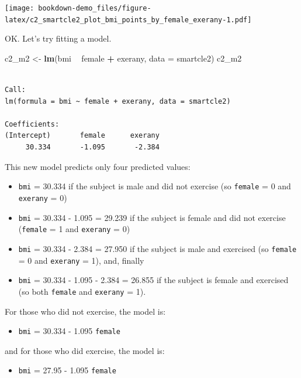 \documentclass[]{book}
\newenvironment{Shaded}{\begin{snugshade}}{\end{snugshade}}
\newcommand{\KeywordTok}[1]{\textcolor[rgb]{0.13,0.29,0.53}{\textbf{#1}}}
\newcommand{\DataTypeTok}[1]{\textcolor[rgb]{0.13,0.29,0.53}{#1}}
\newcommand{\StringTok}[1]{\textcolor[rgb]{0.31,0.60,0.02}{#1}}
\newcommand{\OperatorTok}[1]{\textcolor[rgb]{0.81,0.36,0.00}{\textbf{#1}}}
\newcommand{\NormalTok}[1]{#1}
\providecommand{\tightlist}{%
  \setlength{\itemsep}{0pt}\setlength{\parskip}{0pt}}
\theoremstyle{definition}
\theoremstyle{definition}
\theoremstyle{definition}
\theoremstyle{remark}
\begin{document}
\texttt{[image: bookdown-demo\_files/figure-latex/c2\_smartcle2\_plot\_bmi\_points\_by\_female\_exerany-1.pdf]}

OK. Let's try fitting a model.

\begin{Shaded}
\begin{Highlighting}[]
\NormalTok{c2_m2 <-}\StringTok{ }\KeywordTok{lm}\NormalTok{(bmi }\OperatorTok{~}\StringTok{ }\NormalTok{female }\OperatorTok{+}\StringTok{ }\NormalTok{exerany, }\DataTypeTok{data =}\NormalTok{ smartcle2)}
\NormalTok{c2_m2}
\end{Highlighting}
\end{Shaded}

\begin{verbatim}

Call:
lm(formula = bmi ~ female + exerany, data = smartcle2)

Coefficients:
(Intercept)       female      exerany  
     30.334       -1.095       -2.384  
\end{verbatim}

This new model predicts only four predicted values:

\begin{itemize}
\tightlist
\item
  \texttt{bmi} = 30.334 if the subject is male and did not exercise (so
  \texttt{female} = 0 and \texttt{exerany} = 0)
\item
  \texttt{bmi} = 30.334 - 1.095 = 29.239 if the subject is female and
  did not exercise (\texttt{female} = 1 and \texttt{exerany} = 0)
\item
  \texttt{bmi} = 30.334 - 2.384 = 27.950 if the subject is male and
  exercised (so \texttt{female} = 0 and \texttt{exerany} = 1), and,
  finally
\item
  \texttt{bmi} = 30.334 - 1.095 - 2.384 = 26.855 if the subject is
  female and exercised (so both \texttt{female} and \texttt{exerany} =
  1).
\end{itemize}

For those who did not exercise, the model is:

\begin{itemize}
\tightlist
\item
  \texttt{bmi} = 30.334 - 1.095 \texttt{female}
\end{itemize}

and for those who did exercise, the model is:

\begin{itemize}
\tightlist
\item
  \texttt{bmi} = 27.95 - 1.095 \texttt{female}
\end{itemize}
\end{document}
